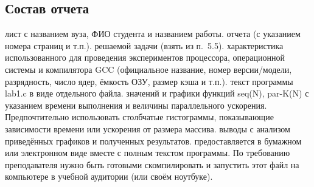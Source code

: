 \subsection{Состав отчета}
\begin{enumerate}
     лист с названием вуза, ФИО студента и названием работы.
     отчета (с указанием номера страниц и т.п.).
     решаемой задачи (взять из п.~5.5).
     характеристика использованного для проведения экспериментов процессора, операционной системы и компилятора GCC (официальное название, номер версии/модели, разрядность, число ядер, ёмкость ОЗУ, размер кэша и т.п.).
     текст программы lab1.c в виде отдельного файла.
     значений и графики функций seq(N), par-K(N) с указанием времени выполнения и величины параллельного ускорения. Предпочтительно использовать столбчатые гистограммы, показывающие зависимости времени или ускорения от размера массива.
     выводы с анализом приведённых графиков и полученных результатов.
     предоставляется в бумажном или электронном виде вместе с полным текстом программы. По требованию преподавателя нужно быть готовыми скомпилировать и запустить этот файл на компьютере в учебной аудитории (или своём ноутбуке).
\end{enumerate}

